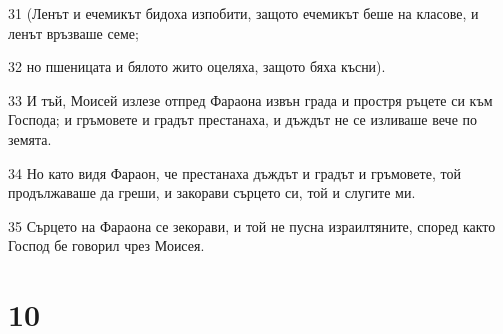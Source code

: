 \par 31 (Ленът и ечемикът бидоха изпобити, защото ечемикът беше на класове, и ленът връзваше семе;
\par 32 но пшеницата и бялото жито оцеляха, защото бяха късни).
\par 33 И тъй, Моисей излезе отпред Фараона извън града и простря ръцете си към Господа; и гръмовете и градът престанаха, и дъждът не се изливаше вече по земята.
\par 34 Но като видя Фараон, че престанаха дъждът и градът и гръмовете, той продължаваше да греши, и закорави сърцето си, той и слугите ми.
\par 35 Сърцето на Фараона се зекорави, и той не пусна израилтяните, според както Господ бе говорил чрез Моисея.

\chapter{10}

